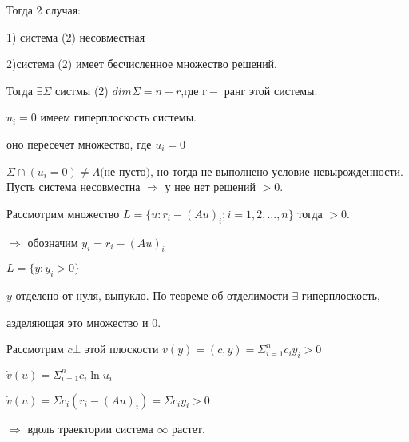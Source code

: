 \documentclass[oneside, final, 12pt]{article}
\begin{document}
\begin{large}
Тогда 2 случая:

\begin{center}
1) система (2) несовместная

2)система (2) имеет бесчисленное множество решений.
\end{center}

Тогда $\exists \Sigma$ систмы (2) $ dim \Sigma = n - r $,где  $г - $ ранг этой системы.

\vspace{0.5cm}
$u_i = 0$ имеем гиперплоскость системы.

оно пересечет множество, где $u_i = 0$

$
\Sigma\cap(u_i = 0) \neq\Lambda \textit{(не пусто)}
$, но тогда не выполнено условие невырожденности.
Пусть система несовместна $\Rightarrow$ у нее нет решений $>0$.

Рассмотрим множество $L = \lbrace u : r_i - (Au)_i; i = 1,2,...,n\rbrace$
тогда $>0$.

$\Longrightarrow$ обозначим $y_i = r_i - (Au)_i$

$L = \lbrace y : y_i>0\rbrace$

$y $ отделено от нуля, выпукло. По теореме об отделимости $ \exists $ гиперплоскость, 

азделяющая это множество и 0.

\begin{figure} [h!]
			\caption{}	
\end{figure}

\vspace{0.5cm}
Рассмотрим $ c \bot $ этой плоскости $v(y) = (c,y) = \Sigma_{i=1}^n c_i y_i > 0$

$ \dot{v}(u) = \Sigma_{i=1}^n c_i \ln u_i $

$ \dot{v}(u) = \Sigma c_i(r_i - (Au)_i) = \Sigma c_i y_i > 0 $

$\Rightarrow$ вдоль траектории система $\infty$ растет.









\end{large}
\end{document}
